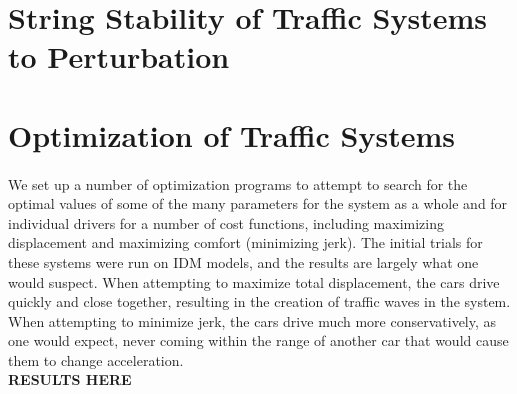 \documentclass[12pt]{article}
\begin{document}
\section{String Stability of Traffic Systems to Perturbation}


\section{Optimization of Traffic Systems}
\paragraph{}We set up a number of optimization programs to attempt to search for the optimal values of some of the many parameters for the system as a whole and for individual drivers for a number of cost functions, including maximizing displacement and maximizing comfort (minimizing jerk). The initial trials for these systems were run on IDM models, and the results are largely what one would suspect. When attempting to maximize total displacement, the cars drive quickly and close together, resulting in the creation of traffic waves in the system. When attempting to minimize jerk, the cars drive much more conservatively, as one would expect, never coming within the range of another car that would cause them to change acceleration. \\
\textbf{RESULTS HERE}
\end{document}
